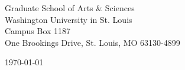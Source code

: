 \begin{minipage}{0.49\textwidth}
\begin{flushleft}
\noindent 
Graduate School of Arts & Sciences \\
Washington University in St. Louis \\
Campus Box 1187 \\
One Brookings Drive, St. Louis, MO 63130-4899
\end{flushleft}
\end{minipage}
\begin{minipage}{0.47\textwidth}
\begin{flushright}
\today
\end{flushright}
\end{minipage} \\

\newcommand{\univ}{Washington University in St. Louis}
\newcommand{\univshort}{WUSTL}
\newcommand{\degree}{Ph.D.}
\newcommand{\dept}{Computer Science}
